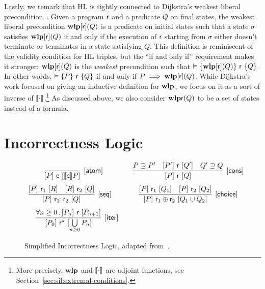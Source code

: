 Lastly, we remark that HL is tightly connected to Dijkstra's weakest liberal precondition~\cite{Dijkstra75}. Given a program $\mathsf{r}$ and a predicate $Q$ on final states, the weakest liberal precondition $\textbf{wlp}[\mathsf{r}](Q)$ is a predicate on initial states such that a state $\sigma$ satisfies $\textbf{wlp}[\mathsf{r}](Q)$ if and only if the execution of $\mathsf{r}$ starting from $\sigma$ either doesn't terminate or terminates in a state satisfying $Q$. This definition is reminiscent of the validity condition for HL triples, but the ``if and only if'' requirement makes it stronger: $\textbf{wlp}[\mathsf{r}](Q)$ is the \emph{weakest} precondition such that $\vDash \{\textbf{wlp}[\mathsf{r}](Q)\}~\mathsf{r}~\{Q\}$. In other words, $\vDash \{P\}~\mathsf{r}~\{Q\}$ if and only if $P \implies \textbf{wlp}[\mathsf{r}](Q)$.
While Dijkstra's work focused on giving an inductive definition for $\textbf{wlp}$, we focus on it as a sort of inverse of $\llbracket\cdot\rrbracket$.\footnote{More precisely, $\textbf{wlp}$ and $\llbracket\cdot\rrbracket$ are adjoint functions, see Section~\ref{sec:sil:extremal-conditions}.} As discussed above, we also consider $\textbf{wlp}{\mathsf{r}}(Q)$ to be a set of states instead of a formula.

\section{Incorrectness Logic}\label{sec:bg:il}

\begin{figure}[t]
	\centering
	\begin{framed}
		\(
		\begin{array}{cc}
			\infer[\ilrule{atom}]
			{\iltriple{P}{\expe}{\denot{\expe}P}}
			{}
			\quad                       &
			\infer[\ilrule{cons}]
			{\iltriple{P}{\regr}{Q}}
			{P \supseteq P'             & \iltriple{P'}{\regr}{Q'}    & Q' \supseteq Q}
			\\[7.5pt]
			\infer[\ilrule{seq}]
			{\iltriple{P}{\regr_1;\regr_2}{Q}}
			{\iltriple{P}{\regr_1}{R}   & \iltriple{R}{\regr_2}{Q}}
			\qquad                      &
			\infer[\ilrule{choice}]
			{\iltriple{P}{\regr_1 \regplus \regr_2}{Q_1 \cup Q_2}}
			{\iltriple{P}{\regr_1}{Q_1} & \iltriple{P}{\regr_2}{Q_2}}
			\\[7.5pt]
			\infer[\ilrule{iter}]
			{\iltriple{P_0}{\regr^\kstar}{\bigcup\limits_{n \ge 0} P_n}}
			{\forall n \ge 0 \sdot \iltriple{P_n}{\regr}{P_{n+1}}}
		\end{array}
		\)
	\end{framed}
	\vspace{-1ex}
	\caption{Simplified Incorrectness Logic, adapted from~\cite{MOH21}.}
	\label{fig:bg:il}
\end{figure}


